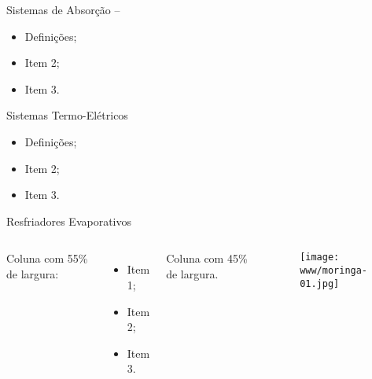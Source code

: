     \begin{frame}[allowframebreaks]{Sistemas de Absorção -- }\vspace*{-0em}
        \begin{itemize}
            \item<1-> Definições;
            \item<1-> Item 2;
            \item<1-> Item 3.
        \end{itemize}
    \end{frame}

    \begin{frame}{Sistemas Termo-Elétricos}\vspace*{-0em}
        \begin{itemize}
            \item<1-> Definições;
            \item<1-> Item 2;
            \item<1-> Item 3.
        \end{itemize}
    \end{frame}

    \begin{frame}{Resfriadores Evaporativos}\vspace*{-0em}
        \begin{columns}
            Coluna com 55\% de largura:\\[\smallskipamount]
            \begin{itemize}
                \item<1-> Item 1;
                \item<2-> Item 2;
                \item<3-> Item 3.
            \end{itemize}
            Coluna com 45\% de largura.
            \begin{center}
                \begin{figure}
                    \texttt{[image: www/moringa-01.jpg]}
                \end{figure}
            \end{center}
        \end{columns}
    \end{frame}

